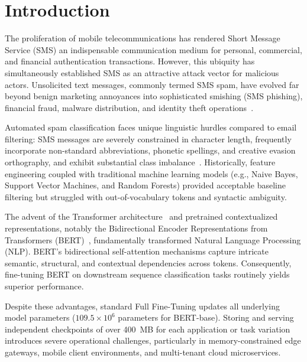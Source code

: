 \documentclass[conference]{IEEEtran}
\begin{document}
\section{Introduction}
\label{sec:intro}

The proliferation of mobile telecommunications has rendered Short Message Service (SMS) an indispensable communication medium for personal, commercial, and financial authentication transactions. However, this ubiquity has simultaneously established SMS as an attractive attack vector for malicious actors. Unsolicited text messages, commonly termed SMS spam, have evolved far beyond benign marketing annoyances into sophisticated smishing (SMS phishing), financial fraud, malware distribution, and identity theft operations~\cite{almeida2011sms}. 

Automated spam classification faces unique linguistic hurdles compared to email filtering: SMS messages are severely constrained in character length, frequently incorporate non-standard abbreviations, phonetic spellings, and creative evasion orthography, and exhibit substantial class imbalance~\cite{almeida2011sms}. Historically, feature engineering coupled with traditional machine learning models (e.g., Naive Bayes, Support Vector Machines, and Random Forests) provided acceptable baseline filtering but struggled with out-of-vocabulary tokens and syntactic ambiguity.

The advent of the Transformer architecture~\cite{vaswani2017attention} and pretrained contextualized representations, notably the Bidirectional Encoder Representations from Transformers (BERT)~\cite{devlin2019bert}, fundamentally transformed Natural Language Processing (NLP). BERT's bidirectional self-attention mechanisms capture intricate semantic, structural, and contextual dependencies across tokens. Consequently, fine-tuning BERT on downstream sequence classification tasks routinely yields superior performance.

Despite these advantages, standard Full Fine-Tuning updates all underlying model parameters ($109.5\times 10^6$ parameters for BERT-base). Storing and serving independent checkpoints of over 400~MB for each application or task variation introduces severe operational challenges, particularly in memory-constrained edge gateways, mobile client environments, and multi-tenant cloud microservices.
\end{document}

